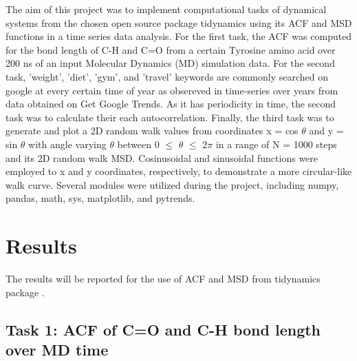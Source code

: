 \documentclass{article}
\begin{document}
The aim of this project was to implement computational tasks of dynamical systems from the chosen open source package tidynamics \cite{Buyl2018} using its ACF and MSD functions in a time series data analysis. For the first task, the ACF was computed for the bond length of C-H and C=O from a certain Tyrosine amino acid over 200 ns of an input Molecular Dynamics (MD) simulation data. For the second task, 'weight', 'diet', 'gym', and 'travel' keywords are commonly searched on google at every certain time of year as obsereved in time-series over years from data obtained on Get Google Trends. As it has periodicity in time, the second task was to calculate their each autocorrelation. Finally, the third task was to generate and plot a 2D random walk values from coordinates x = cos $\theta$ and y = sin $\theta$ with angle varying $\theta$ between 0 $\leq$ $\theta$ $\leq$ $2\pi$ in a range of N = 1000 steps and its 2D random walk MSD. Cosinusoidal and sinusoidal functions were employed to x and y coordinates, respectively, to demonstrate a more circular-like walk curve. Several modules were utilized during the project, including numpy, pandas, math, sys, matplotlib, and pytrends.

\section{Results}

The results will be reported for the use of ACF and MSD from tidynamics package \cite{Buyl2018}.

\subsection{Task 1: ACF of C=O and C-H bond length over MD time}
\end{document}
